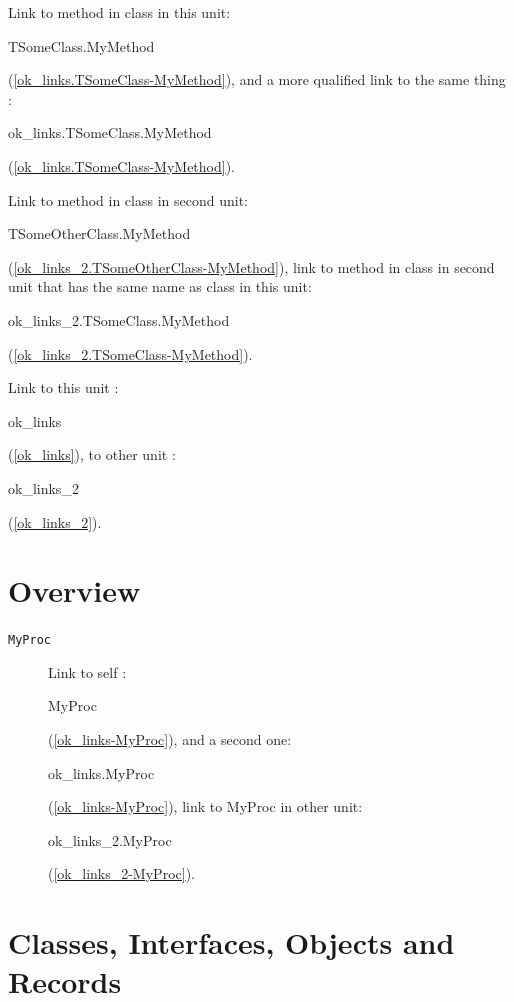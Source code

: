 \documentclass{report}
\begin{document}
Link to method in class in this unit: \begin{ttfamily}TSomeClass.MyMethod\end{ttfamily}(\ref{ok_links.TSomeClass-MyMethod}), and a more qualified link to the same thing : \begin{ttfamily}ok{\_}links.TSomeClass.MyMethod\end{ttfamily}(\ref{ok_links.TSomeClass-MyMethod}).

Link to method in class in second unit: \begin{ttfamily}TSomeOtherClass.MyMethod\end{ttfamily}(\ref{ok_links_2.TSomeOtherClass-MyMethod}), link to method in class in second unit that has the same name as class in this unit: \begin{ttfamily}ok{\_}links{\_}2.TSomeClass.MyMethod\end{ttfamily}(\ref{ok_links_2.TSomeClass-MyMethod}).

Link to this unit : \begin{ttfamily}ok{\_}links\end{ttfamily}(\ref{ok_links}), to other unit : \begin{ttfamily}ok{\_}links{\_}2\end{ttfamily}(\ref{ok_links_2}).
\section{Overview}
\begin{description}
\item[\texttt{\begin{ttfamily}TSomeClass\end{ttfamily} Class}]
\end{description}
\begin{description}
\item[\texttt{MyProc}]Link to self : \begin{ttfamily}MyProc\end{ttfamily}(\ref{ok_links-MyProc}), and a second one: \begin{ttfamily}ok{\_}links.MyProc\end{ttfamily}(\ref{ok_links-MyProc}), link to MyProc in other unit: \begin{ttfamily}ok{\_}links{\_}2.MyProc\end{ttfamily}(\ref{ok_links_2-MyProc}).
\end{description}
\section{Classes, Interfaces, Objects and Records}
\end{document}
